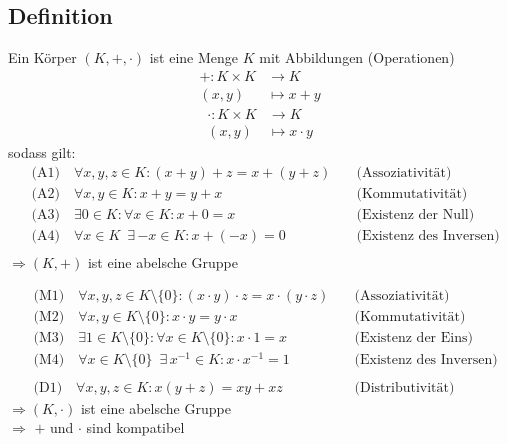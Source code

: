 \subsection{Definition}
Ein Körper \( (K,+,\cdot ) \) ist eine Menge \(K\) mit Abbildungen (\grqq Operationen\grqq)
\begin{align*}
+ : K \times K &\longrightarrow K \\
(x,y) &\longmapsto x+y
\end{align*}
\begin{align*}
\cdot : K \times K &\longrightarrow K \\
(x,y)  &\longmapsto x \cdot y
\end{align*}
sodass gilt:
\begin{align*}
&\text{(A1)} \quad  \forall x,y,z \in K : (x+y)+z = x+(y+z) \quad &\text{(Assoziativität)} \\
&\text{(A2)} \quad \forall x,y \in K : x+y = y+x \quad &\text{(Kommutativität)} \\
&\text{(A3)} \quad  \exists 0 \in K : \forall x \in K : x+0=x \quad &\text{(Existenz der Null)} \\
&\text{(A4)} \quad  \forall x \in K \enspace \exists \, {-x} \in K : x + (-x) = 0 \quad &\text{(Existenz des Inversen)} \\
\end{align*}
\(\Longrightarrow (K,+)\) ist eine abelsche Gruppe

\begin{align*}
&\text{(M1)} \quad  \forall x,y,z \in K \setminus \{0\} : (x\cdot y) \cdot z = x\cdot (y\cdot z) \quad &\text{(Assoziativität)} \\
&\text{(M2)} \quad \forall x,y \in K \setminus \{0\} : x\cdot y = y\cdot x \quad &\text{(Kommutativität)} \\
&\text{(M3)} \quad  \exists 1 \in K \setminus \{0\} : \forall x \in K \setminus \{0\} : x\cdot 1=x \quad &\text{(Existenz der Eins)} \\
&\text{(M4)} \quad  \forall x \in K \setminus \{0\} \enspace \exists \, x^{-1} \in K : x \cdot x^{-1} = 1 \quad &\text{(Existenz des Inversen)} \\
&{} &{} \\
&\text{(D1)} \quad  \forall x,y,z \in K  : x(y+z) = xy +xz \quad &\text{(Distributivität)} 
\end{align*}
\(\Longrightarrow (K,\cdot )\) ist eine abelsche Gruppe \\
\(\Longrightarrow\) \(+\) und \(\cdot\) sind kompatibel

